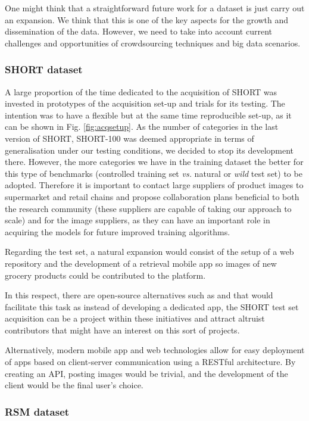 One might think that a straightforward future work for a dataset is just carry out an expansion. We think that this is one of the key aspects for the growth and dissemination of the data. However, we need to take into account current challenges and opportunities of crowdsourcing techniques and big data scenarios.

\subsubsection{SHORT dataset}

A large proportion of the time dedicated to the acquisition of SHORT was invested in prototypes of the acquisition set-up and trials for its testing. The intention was to have a flexible but at the same time reproducible set-up, as it can be shown in Fig. \ref{fig:acqsetup}. As the number of categories in the last version of SHORT, SHORT-100 was deemed appropriate in terms of generalisation under our testing conditions, we decided to stop its development there. However, the more categories we have in the training dataset the better for this type of benchmarks (controlled training set \textit{vs.} natural or \textit{wild} test set) to be adopted. Therefore it is important to contact large suppliers of product images to supermarket and retail chains and propose collaboration plans beneficial to both the research community (these suppliers are capable of taking our approach to scale) and for the image suppliers, as they can have an important role in acquiring the models for future improved training algorithms.

Regarding the test set, a natural expansion would consist of the setup of a web repository and the development of a retrieval mobile app so images of new grocery products could be contributed to the platform.

In this respect, there are open-source alternatives such as \cite{apple} and \cite{google} that would facilitate this task as instead of developing a dedicated app, the SHORT test set acquisition can be a project within these initiatives and attract altruist contributors that might have an interest on this sort of projects.

Alternatively, modern mobile app and web technologies allow for easy deployment of apps based on client-server communication using a RESTful architecture. By creating an API, posting images would be trivial, and the development of the client would be the final user's choice.

\subsubsection{RSM dataset}

